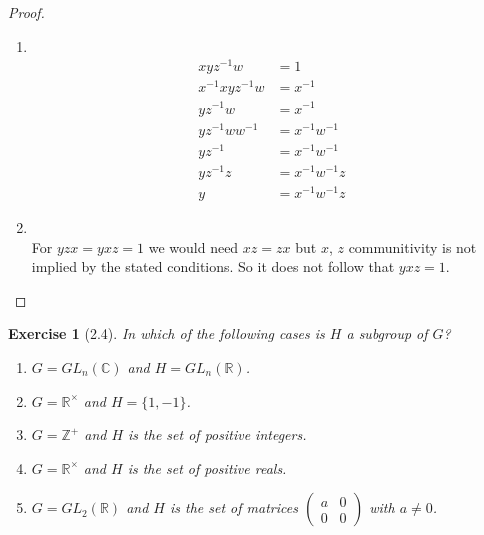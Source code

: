\documentclass[12pt,leqno]{article}
\numberwithin{equation}{section}
\newtheorem*{exer}{Exercise}
\theoremstyle{definition}
\begin{document}
\begin{proof}[Proof] \hfill \\

\begin{enumerate}
\item[(a)] \hfill \\

    \begin{align*}
        xyz^{-1}w &= 1  \\
        x^{-1}xyz^{-1}w &= x^{-1}    \\
        yz^{-1}w &= x^{-1}  \\
        yz^{-1}ww^{-1} &= x^{-1}w^{-1}  \\
        yz^{-1} &= x^{-1}w^{-1}  \\
        yz^{-1}z &= x^{-1}w^{-1}z   \\
        y &= x^{-1}w^{-1}z
    \end{align*}

\item[(b)] \hfill \\ 

    For $yzx = yxz = 1$ we would need $xz = zx$ but $x$, $z$ communitivity is
    not implied by the stated conditions. So it does not follow that $yxz = 1$.
    
\end{enumerate}
\end{proof}

\begin{exer}[2.4]
In which of the following cases is $H$ a subgroup of $G$?
\begin{enumerate}
\item[(a)] $G=GL_n(\mathbb C)$ and $H=GL_n(\mathbb R)$.
\item[(b)] $G=\mathbb R^{\times}$ and $H=\{1,-1\}$.
\item[(c)] $G=\mathbb Z^{+}$ and $H$ is the set of positive integers.
\item[(d)] $G=\mathbb R^{\times}$ and $H$ is the set of positive reals.
\item[(e)] $G=GL_2(\mathbb R)$ and $H$ is the set of matrices
$\left ( \begin{array}{cc}
a & 0 \\ 
0 & 0 
\end{array} \right )$ with $a \neq 0$.
\end{enumerate}
\end{exer}
\end{document}
